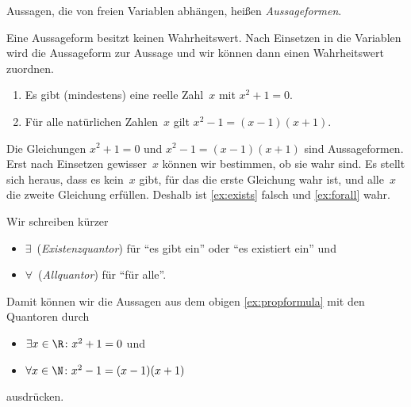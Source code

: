 \documentclass[a4paper]{article}
\begin{document}
\begin{definition}[Aussageform]
    Aussagen, die von freien Variablen abhängen, heißen \emph{Aussageformen}.
\end{definition}

Eine Aussageform besitzt keinen Wahrheitswert. Nach Einsetzen in die Variablen wird die Aussageform zur Aussage und wir können dann einen Wahrheitswert zuordnen.

\begin{example}\label{ex:propformula}\leavevmode
    \begin{enumerate}
        \item Es gibt (mindestens) eine reelle Zahl~$x$ mit $x^2 + 1 = 0$.\label{ex:exists}
        \item Für alle natürlichen Zahlen~$x$ gilt $x^2 - 1 = (x - 1) (x + 1)$.\label{ex:forall}
    \end{enumerate}
    Die Gleichungen $x^2 + 1 = 0$ und $x^2 - 1 = (x - 1) (x + 1)$ sind Aussageformen. Erst nach Einsetzen gewisser~$x$ können wir bestimmen, ob sie wahr sind. Es stellt sich heraus, dass es kein~$x$ gibt, für das die erste Gleichung wahr ist, und alle~$x$ die zweite Gleichung erfüllen. Deshalb ist \cref{ex:exists} falsch und \cref{ex:forall} wahr.
\end{example}

\begin{notation}[Quantoren]
    Wir schreiben kürzer
    \begin{itemize}
        \item $\exists$~(\emph{Existenzquantor}) für "`es gibt ein"' oder "`es existiert ein"' und
        \item $\forall$~(\emph{Allquantor}) für "`für alle"'.
    \end{itemize}
\end{notation}

Damit können wir die Aussagen aus dem obigen \cref{ex:propformula} mit den Quantoren durch
\begin{itemize}
    \item $\exists x \in \R\colon x^2 + 1 = 0$ und
    \item $\forall x \in \N\colon x^2 - 1 = (x - 1) (x + 1)$
\end{itemize}
ausdrücken.
\end{document}

